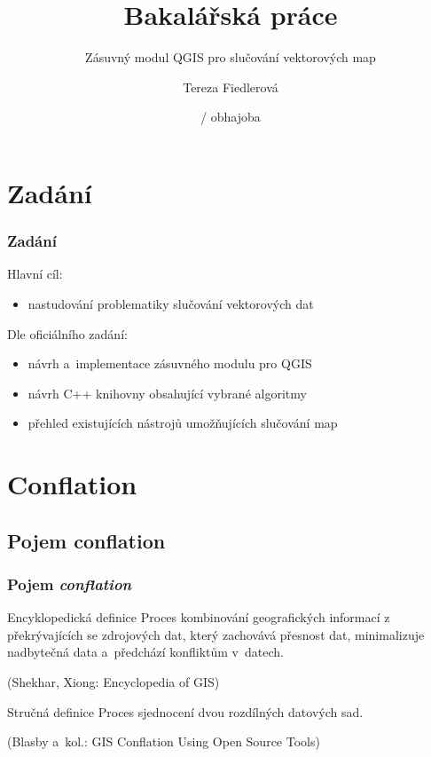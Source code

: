 \documentclass[unicode,bookmarksnumbered]{beamer}
\title[Zásuvný modul QGIS pro slučování vektorových map]{Bakalářská práce}
\subtitle{Zásuvný modul QGIS pro slučování vektorových map}
\author{Tereza Fiedlerová}
\institute[ČVUT]{ČESKÉ VYSOKÉ UČENÍ TECHNICKÉ V PRAZE\\
		Katedra mapování a~kartografie}
\date[červen 2013]{{\denD} / obhajoba }
\begin{document}
  \begin{frame}
    \titlepage %
  \end{frame}


  \section{Zadání}  %
  \begin{frame}
   \frametitle{Zadání}
    Hlavní cíl:
     \begin{itemize}
      \item nastudování problematiky slučování vektorových dat
     \end{itemize}
     Dle oficiálního zadání:
     \begin{itemize}
      \item návrh a~implementace zásuvného modulu pro QGIS
      \item návrh C++ knihovny obsahující vybrané algoritmy
      \item přehled existujících nástrojů umožňujících slučování map
     \end{itemize}
  \end{frame}

\section{Conflation}  %

  \subsection{Pojem conflation}
  \begin{frame}
  \frametitle{Pojem \textit{conflation}}

    \begin{block}{Encyklopedická definice}
     Proces kombinování geografických informací z překrývajících se
     zdrojových dat, který zachovává přesnost dat, minimalizuje 
     nadbytečná data a~předchází konfliktům v~datech.
    \end{block}
     {\small(Shekhar, Xiong: Encyclopedia of GIS)}

    \begin{block}{Stručná definice}
     Proces sjednocení dvou rozdílných datových sad.
    \end{block}
     {\small(Blasby a~kol.: GIS Conflation Using Open Source Tools)}

  \end{frame}
\end{document}
